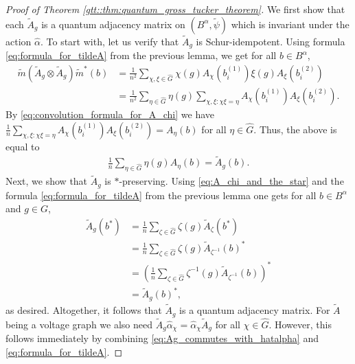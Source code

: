 \documentclass{amsart}
\theoremstyle{definition}
\theoremstyle{definition}
\begin{document}
\begin{proof}[Proof of Theorem \ref{gtt::thm:quantum_gross_tucker_theorem}]
    We first show that each $\tilde{A}_g$ is a quantum adjacency matrix on $(B^\alpha, \tilde{\psi})$ which is invariant under the action $\hat{\alpha}$.
    To start with, let us verify that $\tilde{A}_g$ is Schur-idempotent. Using formula \eqref{eq:formula_for_tildeA} from the previous lemma, we get for all $b \in B^\alpha$,
    \begin{align*}
        \tilde{m}\left(\tilde{A}_g \otimes \tilde{A}_g\right) \tilde{m}^\ast(b)
            &= \frac{1}{n^2} \sum_{\chi, \xi \in \hat{G}} \chi(g) A_\chi(b_i^{(1)}) \xi(g) A_\xi(b_i^{(2)}) \\
            &= \frac{1}{n^2} \sum_{\eta \in \hat{G}} \eta(g) \sum_{\chi, \xi: \chi \xi = \eta} A_\chi(b_i^{(1)}) A_\xi(b_i^{(2)}).
    \end{align*}
    By \eqref{eq:convolution_formula_for_A_chi} we have $\frac{1}{n} \sum_{\chi, \xi: \chi \xi = \eta} A_\chi(b_i^{(1)}) A_\xi(b_i^{(2)}) = A_\eta(b)$ for all $\eta \in \hat{G}$. Thus, the above is equal to
    \begin{align*}
        \frac{1}{n} \sum_{\eta \in \hat{G}} \eta(g) A_\eta(b) = \tilde{A}_g(b).
    \end{align*} 
    Next, we show that $\tilde{A}_g$ is $\ast$-preserving. Using \eqref{eq:A_chi_and_the_star} and the formula \eqref{eq:formula_for_tildeA} from the previous lemma one gets for all $b \in B^\alpha$ and $g \in G$,
    \begin{align*}
        \tilde{A}_g(b^\ast)  
            &= \frac{1}{n} \sum_{\zeta \in \hat{G}} \zeta(g) \tilde{A}_\zeta(b^\ast) \\
            &= \frac{1}{n} \sum_{\zeta \in \hat{G}} \zeta(g) \tilde{A}_{\zeta^{-1}}(b)^\ast \\
            &= \left( \frac{1}{n} \sum_{\zeta \in \hat{G}} \zeta^{-1}(g) \tilde{A}_{\zeta^{-1}}(b) \right)^\ast \\
            &= \tilde{A}_g(b)^\ast,
    \end{align*}
    as desired. Altogether, it follows that $\tilde{A}_g$ is a quantum adjacency matrix. For $\tilde{A}$ being a voltage graph we also need $\tilde{A}_g \hat{\alpha}_\chi = \hat{\alpha}_\chi \tilde{A}_g$ for all $\chi \in \hat{G}$. However, this follows immediately by combining \eqref{eq:Ag_commutes_with_hatalpha} and \eqref{eq:formula_for_tildeA}.


\end{proof}
\end{document}
